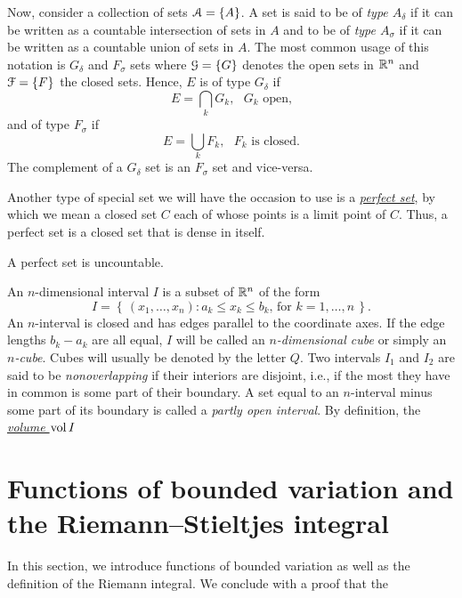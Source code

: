 Now, consider a collection of sets $\mathcal{A}=\{A\}$. A set is said to be of
\emph{type $A_\delta$} if it can be written as a countable intersection of
sets in $A$ and to be of \emph{type $A_\sigma$} if it can be written as a
countable union of sets in $A$. The most common usage of this notation is
$G_\delta$ and $F_\sigma$ sets where $\mathcal{G}=\{G\}$ denotes the open sets in
$\mathbb{R}^n$ and $\mathcal{F}=\{F\}$ the closed sets. Hence, $E$ is of type
\href{https://en.wikipedia.org/wiki/G-delta_set}{$G_\delta$} if
\begin{equation}
  \label{eq:1:g-delta-set}
E=\bigcap_k G_k,\text{ $G_k$ open,}
\end{equation}
and of type \href{https://en.wikipedia.org/wiki/F-sigma_set}{$F_\sigma$} if
\begin{equation}
  \label{eq:1:f-sigma}
E=\bigcup_k F_k,\text{ $F_k$ is closed.}
\end{equation}
The complement of a $G_\delta$ set is an $F_\sigma$ set and vice-versa.

Another type of special set we will have the occasion to use is a
\href{https://en.wikipedia.org/wiki/Perfect_set}{\emph{perfect set}}, by
which we mean a closed set $C$ each of whose points is a limit point of
$C$. Thus, a perfect set is a closed set that is dense in itself.

\begin{theorem}[1.9]
A perfect set is uncountable.
\end{theorem}

An $n$-dimensional interval $I$ is a subset of $\mathbb{R}^n$ of the form
\begin{equation}
\label{eq:1:n-interval}
I=\left\{\,(x_1,\dotsc,x_n):\text{$a_k\leq x_k\leq b_k$, for $k=1,\dotsc,n$}\,\right\}.
\end{equation}
An $n$-interval is closed and has edges parallel to the coordinate axes. If
the edge lengths $b_k-a_k$ are all equal, $I$ will be called an
\emph{$n$-dimensional cube} or simply an \emph{$n$-cube}. Cubes will
usually be denoted by the letter $Q$. Two intervals $I_1$ and $I_2$ are
said to be \emph{nonoverlapping} if their interiors are disjoint, i.e., if
the most they have in common is some part of their boundary. A set equal to
an $n$-interval minus some part of its boundary is called a \emph{partly
  open interval}. By definition, the \href{}{\emph{volume $\operatorname{vol} I$}}


\section{Functions of bounded variation and the Riemann--Stieltjes
  integral}
In this section, we introduce functions of bounded variation as well as the
definition of the Riemann integral. We conclude with a proof that the

